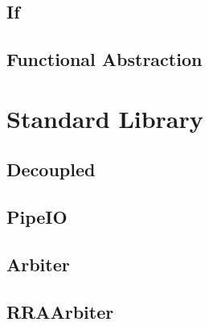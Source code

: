 \documentclass[10pt,landscape]{article}
\begin{document}
\begin{multicols}{3}
\subsection{If}

\subsection{Functional Abstraction}

\section{Standard Library}
\subsection{Decoupled}
\subsection{PipeIO}
\subsection{Arbiter}
\subsection{RRAArbiter}


\end{multicols}
\end{document}
